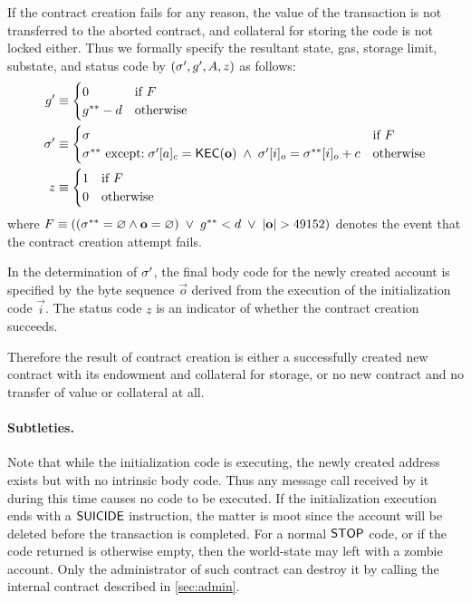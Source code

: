 If the contract creation fails for any reason, the value of the transaction is not transferred to the aborted contract, and collateral for storing the code is not locked either.
Thus we formally specify the resultant state, gas, storage limit, substate, and status code by $\left(\mathbf{\sigma}', g', A, z\right)$ as follows:
\begin{align}
	g' &\equiv \begin{cases}
		0 & \mbox{if $F$}\\
		g^{**}-d & \mbox{otherwise}
	\end{cases} \\
	\mathbf{\sigma}' &\equiv 
	\begin{cases}
		\mathbf{\sigma} 	 	& \mbox{if $F$}\\
		\mathbf{\sigma}^{**} 	\mbox{ except:} 
		\; \mathbf{\sigma}'[a]_c = \mathsf{KEC}(\mathbf{o})\;\land\; \mathbf{\sigma}'[i]_o=\mathbf{\sigma}^{**}[i]_o+c& \mbox{otherwise}
	\end{cases}\\
	z &\equiv 
	\begin{cases}
		1	 	& \mbox{if $F$}\\
		0	 	& \mbox{otherwise}
	\end{cases}
\end{align}
where $F\eqdef\left( \left(\st^{**}=\varnothing \land \vec{o}=\varnothing \right)\;\lor\; g^{**}<d \;\lor\;|{\bf o}|>49152 \right)$
denotes the event that the contract creation attempt fails.

In the determination of $\mathbf{\sigma}'$, the final body code for the newly created account is specified by the byte sequence $\vec{o}$ derived from the execution of the initialization code $\vec{i}$.
The status code $z$ is an indicator of whether the contract creation succeeds.

Therefore the result of contract creation is either a successfully created new contract with its endowment and collateral for storage, or no new contract and no transfer of value or collateral at all.

\paragraph{Subtleties.} 
Note that while the initialization code is executing, the newly created address exists but with no intrinsic body code. 
Thus any message call received by it during this time causes no code to be executed. 
If the initialization execution ends with a $\mathsf{SUICIDE}$ instruction, the matter is moot since the account will be deleted before the transaction is completed. 
For a normal $\mathsf{STOP}$ code, or if the code returned is otherwise empty, then the world-state may left with a zombie account. Only the administrator of such contract can destroy it by calling the internal contract described in \cref{sec:admin}.



